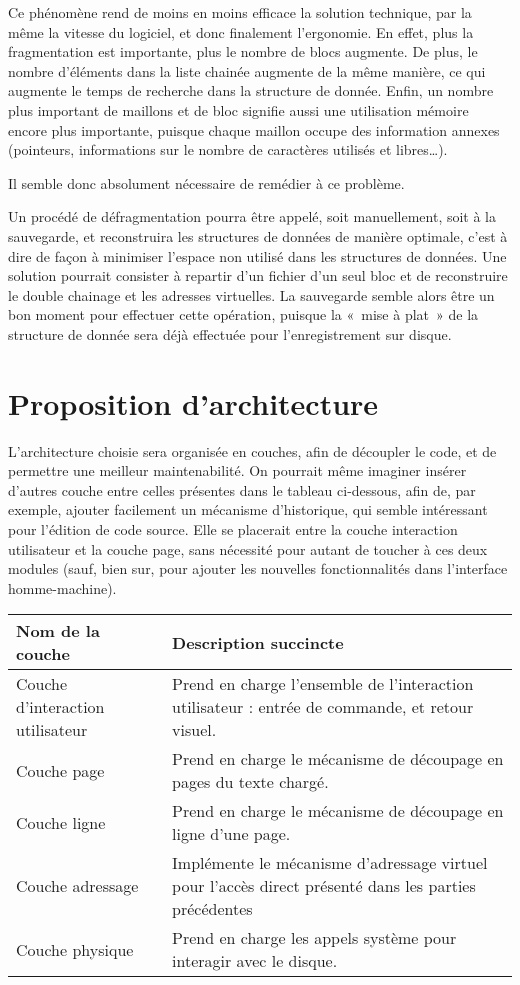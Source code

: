 Ce phénomène rend de moins en moins efficace la solution technique, par la
même la vitesse du logiciel, et donc finalement l'ergonomie. En effet,
plus la fragmentation est importante, plus le nombre de blocs augmente. De plus,
le nombre d'éléments dans la liste chainée augmente de la même manière, ce
qui augmente le temps de recherche dans la structure de donnée.
Enfin, un nombre plus important de maillons et de bloc signifie aussi une
utilisation mémoire encore plus importante, puisque chaque maillon occupe des
information annexes (pointeurs, informations sur le nombre de caractères
utilisés et libres\ldots).

Il semble donc absolument nécessaire de remédier à ce problème.

Un procédé de défragmentation pourra être appelé, soit manuellement, soit à la
sauvegarde, et reconstruira les structures de données de manière optimale, c'est
à dire de façon à minimiser l'espace non utilisé dans les structures de données.
Une solution pourrait consister à repartir d'un fichier d'un seul bloc et de
reconstruire le double chainage et les adresses virtuelles. La sauvegarde semble
alors être un bon moment pour effectuer cette opération, puisque la «~mise à
plat~» de la structure de donnée sera déjà effectuée pour l'enregistrement sur
disque.



\section{Proposition d'architecture}
L'architecture choisie sera organisée en couches, afin de découpler le code, et de
permettre une meilleur maintenabilité. On pourrait même imaginer insérer
d'autres couche entre celles présentes dans le tableau ci-dessous, afin de, par
exemple, ajouter facilement un mécanisme d'historique, qui semble intéressant
pour l'édition de code source. Elle se placerait entre la couche interaction
utilisateur et la couche page, sans nécessité pour autant de toucher à ces deux
modules (sauf, bien sur, pour ajouter les nouvelles fonctionnalités dans
l'interface homme-machine).

\begin{center}
    \begin{tabular}{l|p{7cm}}
	Nom de la couche & Description succincte \\
	\hline \hline
	Couche d'interaction utilisateur & Prend en charge l'ensemble de
	l'interaction utilisateur : entrée de commande, et retour visuel.\\
	\hline
	Couche page & Prend en charge le mécanisme de découpage en pages du
	texte chargé.\\
	\hline
	Couche ligne & Prend en charge le mécanisme de découpage en ligne d'une
	page.\\
	\hline
	Couche adressage & Implémente le mécanisme d'adressage virtuel pour
	l'accès direct présenté dans les parties précédentes\\
	\hline
	Couche physique & Prend en charge les appels système pour interagir
	avec le disque.\\
	\hline
    \end{tabular}
\end{center}

